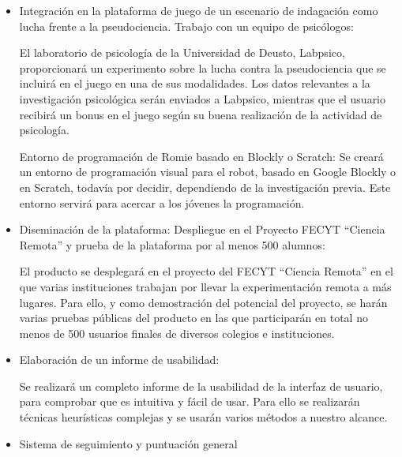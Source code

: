 \begin{itemize}
\item Integración en la plataforma de juego de un escenario de indagación como lucha frente a la
pseudociencia. Trabajo con un equipo de psicólogos:

El laboratorio de psicología de la Universidad de Deusto, Labpsico, proporcionará un experimento
sobre la lucha contra la pseudociencia que se incluirá en el juego en una de sus modalidades. Los
datos relevantes a la investigación psicológica serán enviados a Labpsico, mientras que el usuario
recibirá un bonus en el juego según su buena realización de la actividad de psicología.

Entorno de programación de Romie basado en Blockly o Scratch:
Se creará un entorno de programación visual para el robot, basado en Google Blockly o en Scratch,
todavía por decidir, dependiendo de la investigación previa. Este entorno servirá para acercar a los
jóvenes la programación.

\item Diseminación de la plataforma: Despliegue en el Proyecto FECYT “Ciencia Remota” y prueba de la
plataforma por al menos 500 alumnos:

El producto se desplegará en el proyecto del FECYT “Ciencia Remota” en el que varias instituciones
trabajan por llevar la experimentación remota a más lugares. Para ello, y como demostración del
potencial del proyecto, se harán varias pruebas públicas del producto en las que participarán en
total no menos de 500 usuarios finales de diversos colegios e instituciones.

\item Elaboración de un informe de usabilidad:

Se realizará un completo informe de la usabilidad de la interfaz de usuario, para comprobar que es
intuitiva y fácil de usar. Para ello se realizarán técnicas heurísticas complejas y se usarán varios
métodos a nuestro alcance.

\item Sistema de seguimiento y puntuación general

\end{itemize}
